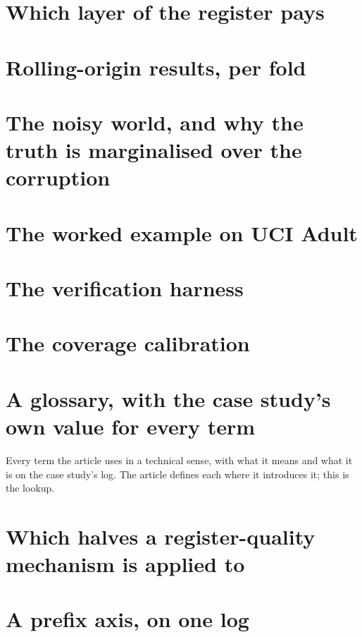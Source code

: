 \documentclass[preprint,12pt,authoryear]{elsarticle}
\theoremstyle{definition}
\begin{document}
\section{Which layer of the register pays}
\label{app:layers}


\section{Rolling-origin results, per fold}
\label{app:rolling}


\section{The noisy world, and why the truth is marginalised over the corruption}
\label{app:noisy}


\section{The worked example on UCI Adult}
\label{app:worked}


\section{The verification harness}
\label{app:verifier}


\section{The coverage calibration}
\label{app:calibration}


\section{A glossary, with the case study's own value for every term}
\label{app:glossary}
Every term the article uses in a technical sense, with what it means and what
it is on the case study's log. The article defines each where it introduces
it; this is the lookup.


\section{Which halves a register-quality mechanism is applied to}
\label{app:degrade}


\section{A prefix axis, on one log}
\label{app:prefix}

\end{document}
